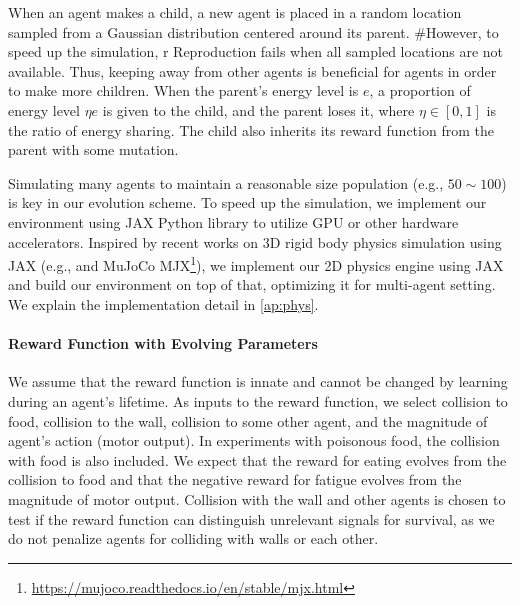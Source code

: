 When an agent makes a child, a new agent is placed in a random location sampled from a Gaussian distribution centered around its parent. #However, to speed up the simulation, r
Reproduction fails when all sampled locations are not available. Thus, keeping away from other agents is beneficial for agents in order to make more children. When the parent's energy level is $e$, a proportion of energy level $\eta e$ is given to the child, and the parent loses it, where $\eta \in [0, 1]$ is the ratio of energy sharing. The child also inherits its reward function from the parent with some mutation.

Simulating many agents to maintain a reasonable size population (e.g., $50\sim 100$) is key in our evolution scheme. To speed up the simulation, we implement our environment using JAX Python library \citep{jax2018github} to utilize GPU or other hardware accelerators. Inspired by recent works on 3D rigid body physics simulation using JAX (e.g., \citet{brax2021github} and MuJoCo \citep{todorov2012mujoco} MJX\footnote{\url{https://mujoco.readthedocs.io/en/stable/mjx.html}}), we implement our 2D physics engine using JAX and build our environment on top of that, optimizing it for multi-agent setting. We explain the implementation detail in \cref{ap:phys}.

\paragraph{Reward Function with Evolving Parameters}
We assume that the reward function is innate and cannot be changed by learning during an agent's lifetime. As inputs to the reward function, we select  collision to food,  collision to the wall,  collision to some other agent, and  the magnitude of agent's action (motor output). In experiments with poisonous food, the collision with food is also included. We expect that the reward for eating evolves from the collision to food and that the negative reward for fatigue evolves from the magnitude of motor output. Collision with the wall and other agents is chosen to test if the reward function can distinguish unrelevant signals for survival, as we do not penalize agents for colliding with walls or each other.

